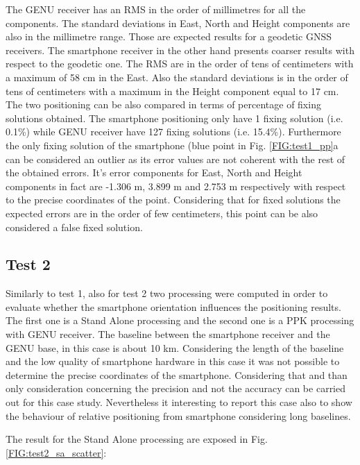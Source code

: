 The GENU receiver has an RMS in the order of millimetres for all the components. The standard deviations in East, North and Height components are also in the millimetre range. Those are expected results for a geodetic GNSS receivers. The smartphone receiver in the other hand presents coarser results with respect to the geodetic one. The RMS are in the order of tens of centimeters with a maximum of 58 cm in the East. Also the standard deviations is in the order of tens of centimeters with a maximum in the Height component equal to 17 cm.      
The two positioning can be also compared in terms of percentage of fixing solutions obtained. The smartphone positioning only have 1 fixing solution (i.e. 0.1\%) while GENU receiver have 127 fixing solutions (i.e. 15.4\%). Furthermore the only fixing solution of the smartphone (blue point in Fig. \ref{FIG:test1_pp}a  can be considered an outlier as its error values are not coherent with the rest of the obtained errors. It's error components for East, North and Height components in fact are -1.306 m, 3.899 m and 2.753 m respectively with respect to the precise coordinates of the point. Considering that for fixed solutions the expected errors are in the order of few centimeters, this point can be also considered a false fixed solution.   

\subsection{Test 2}
Similarly to test 1, also for test 2 two processing were computed in order to evaluate whether the smartphone orientation influences the positioning results. The first one is a Stand Alone processing and the second one is a PPK processing with GENU receiver. The baseline between the smartphone receiver and the GENU base, in this case is about 10 km. Considering the length of the baseline and the low quality of smartphone hardware in this case it was not possible to determine the precise coordinates of the smartphone. Considering that and than only consideration concerning the precision and not the accuracy can be carried out for this case study. Nevertheless it interesting to report this case also to show the behaviour of relative positioning from smartphone considering long baselines.

The result for the Stand Alone processing are exposed in Fig. \ref{FIG:test2_sa_scatter}:


